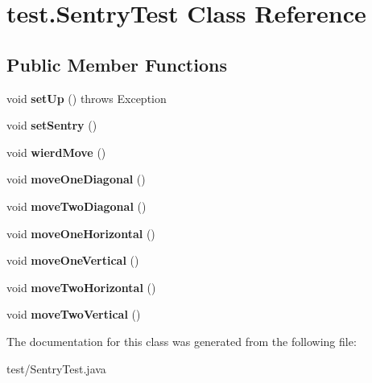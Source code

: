 \hypertarget{classtest_1_1SentryTest}{\section{test.\-Sentry\-Test Class Reference}
\label{classtest_1_1SentryTest}
}
\subsection*{Public Member Functions}
\begin{DoxyCompactItemize}
\item 
\hypertarget{classtest_1_1SentryTest_afd17ac06614caf962e68f7277e32b522}{void {\bfseries set\-Up} ()  throws Exception }\label{classtest_1_1SentryTest_afd17ac06614caf962e68f7277e32b522}

\item 
\hypertarget{classtest_1_1SentryTest_afa4a4c9d62b3b58ca2bafc64fd4489d8}{void {\bfseries set\-Sentry} ()}\label{classtest_1_1SentryTest_afa4a4c9d62b3b58ca2bafc64fd4489d8}

\item 
\hypertarget{classtest_1_1SentryTest_ada1b84d072bd7ce380d2154e0e9e1711}{void {\bfseries wierd\-Move} ()}\label{classtest_1_1SentryTest_ada1b84d072bd7ce380d2154e0e9e1711}

\item 
\hypertarget{classtest_1_1SentryTest_a49e42f05db2fb533073c833a5415f50c}{void {\bfseries move\-One\-Diagonal} ()}\label{classtest_1_1SentryTest_a49e42f05db2fb533073c833a5415f50c}

\item 
\hypertarget{classtest_1_1SentryTest_a6af984de6d97636f6b58f9119360caa5}{void {\bfseries move\-Two\-Diagonal} ()}\label{classtest_1_1SentryTest_a6af984de6d97636f6b58f9119360caa5}

\item 
\hypertarget{classtest_1_1SentryTest_a3fc2a494dcb45bce4acdfac52fd5e5cb}{void {\bfseries move\-One\-Horizontal} ()}\label{classtest_1_1SentryTest_a3fc2a494dcb45bce4acdfac52fd5e5cb}

\item 
\hypertarget{classtest_1_1SentryTest_a87efc7d365443304d2500c51ed1a996f}{void {\bfseries move\-One\-Vertical} ()}\label{classtest_1_1SentryTest_a87efc7d365443304d2500c51ed1a996f}

\item 
\hypertarget{classtest_1_1SentryTest_a56ed76f2b9c7cd09eeaa73373276669a}{void {\bfseries move\-Two\-Horizontal} ()}\label{classtest_1_1SentryTest_a56ed76f2b9c7cd09eeaa73373276669a}

\item 
\hypertarget{classtest_1_1SentryTest_aac1e64c4a15aa3fc3621a9972eacc95d}{void {\bfseries move\-Two\-Vertical} ()}\label{classtest_1_1SentryTest_aac1e64c4a15aa3fc3621a9972eacc95d}

\end{DoxyCompactItemize}


The documentation for this class was generated from the following file\-:\begin{DoxyCompactItemize}
\item 
test/Sentry\-Test.\-java\end{DoxyCompactItemize}

